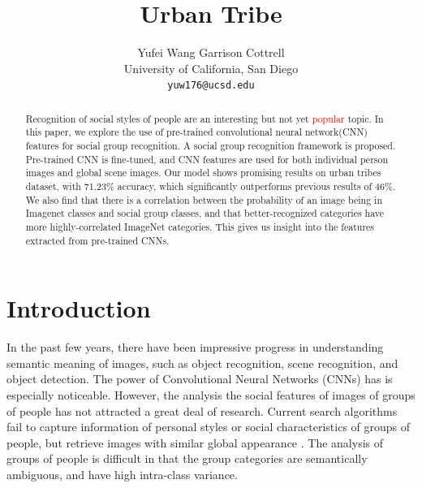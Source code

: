 \documentclass[10pt,twocolumn,letterpaper]{article}
\begin{document}
\title{Urban Tribe}

\author{Yufei Wang \hspace{2cm}  Garrison Cottrell \\
University of California, San Diego\\
{\tt\small yuw176@ucsd.edu}
}

\maketitle
\ifwacvfinal\thispagestyle{empty}\fi

\begin{abstract}
Recognition of social styles of people are an interesting but not yet \textcolor{red} {popular} topic. In this paper, we explore the use of pre-trained convolutional neural network(CNN) features for social group recognition. A social group recognition framework is proposed. Pre-trained CNN is fine-tuned, and CNN features are used for both individual person images and global scene images. Our model shows promising results on urban tribes dataset, with 71.23\% accuracy, which significantly outperforms previous results of 46\%. We also find that there is a correlation between the probability of an image being in Imagenet classes and social group classes, and that better-recognized categories have more highly-correlated ImageNet categories. This gives us insight into the features extracted from pre-trained CNNs.

\end{abstract}

\section{Introduction}

In the past few years, there have been impressive progress in understanding semantic meaning of images, such as object recognition, scene recognition, and object detection. The power of Convolutional Neural Networks (CNNs) has is especially noticeable. However, the analysis the social features of images of groups of people has not attracted a great deal of research. Current search algorithms fail to capture information of personal styles or social characteristics of groups of people, but retrieve images with similar global appearance \cite{urbantribe2}. The analysis of groups of people is difficult in that the group categories are semantically ambiguous, and have high intra-class variance.
\end{document}
